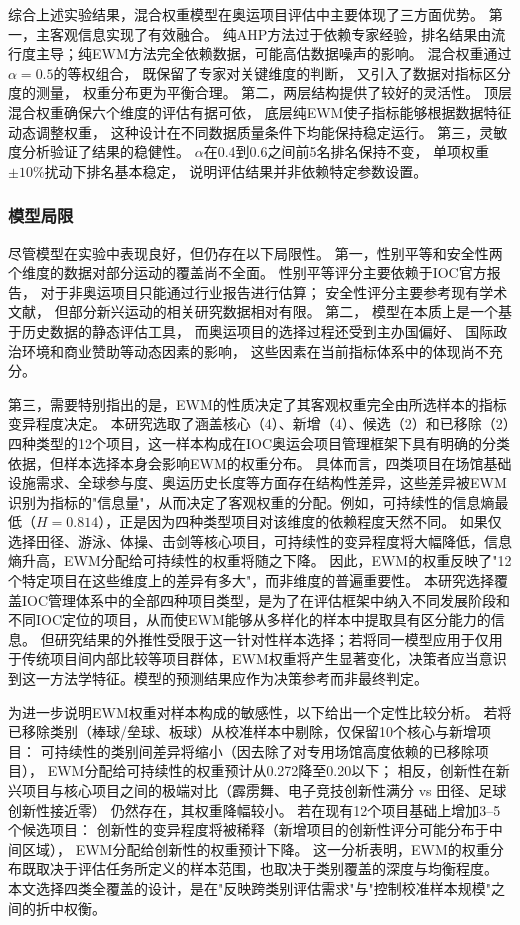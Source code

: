 \documentclass[twoside]{CUGThesis}
\begin{document}
综合上述实验结果，混合权重模型在奥运项目评估中主要体现了三方面优势。
第一，主客观信息实现了有效融合。
纯AHP方法过于依赖专家经验，排名结果由流行度主导；纯EWM方法完全依赖数据，可能高估数据噪声的影响。
混合权重通过$\alpha = 0.5$的等权组合，
既保留了专家对关键维度的判断，
又引入了数据对指标区分度的测量，
权重分布更为平衡合理。
第二，两层结构提供了较好的灵活性。
顶层混合权重确保六个维度的评估有据可依，
底层纯EWM使子指标能够根据数据特征动态调整权重，
这种设计在不同数据质量条件下均能保持稳定运行。
第三，灵敏度分析验证了结果的稳健性。
$\alpha$在0.4到0.6之间前5名排名保持不变，
单项权重$\pm 10\%$扰动下排名基本稳定，
说明评估结果并非依赖特定参数设置。

\subsubsection{模型局限}
\label{sec:ewm_limitation}

尽管模型在实验中表现良好，但仍存在以下局限性。
第一，性别平等和安全性两个维度的数据对部分运动的覆盖尚不全面。
性别平等评分主要依赖于IOC官方报告，
对于非奥运项目只能通过行业报告进行估算；
安全性评分主要参考现有学术文献，
但部分新兴运动的相关研究数据相对有限。
第二，
模型在本质上是一个基于历史数据的静态评估工具，
而奥运项目的选择过程还受到主办国偏好、
国际政治环境和商业赞助等动态因素的影响，
这些因素在当前指标体系中的体现尚不充分。

第三，需要特别指出的是，EWM的性质决定了其客观权重完全由所选样本的指标变异程度决定。
本研究选取了涵盖核心（4）、新增（4）、候选（2）和已移除（2）四种类型的12个项目，这一样本构成在IOC奥运会项目管理框架\cite{IOC2023}下具有明确的分类依据，但样本选择本身会影响EWM的权重分布。
具体而言，四类项目在场馆基础设施需求、全球参与度、奥运历史长度等方面存在结构性差异，这些差异被EWM识别为指标的"信息量"，从而决定了客观权重的分配。例如，可持续性的信息熵最低（$H=0.814$），正是因为四种类型项目对该维度的依赖程度天然不同。
如果仅选择田径、游泳、体操、击剑等核心项目，可持续性的变异程度将大幅降低，信息熵升高，EWM分配给可持续性的权重将随之下降。
因此，EWM的权重反映了"12个特定项目在这些维度上的差异有多大"，而非维度的普遍重要性。
本研究选择覆盖IOC管理体系中的全部四种项目类型，是为了在评估框架中纳入不同发展阶段和不同IOC定位的项目，从而使EWM能够从多样化的样本中提取具有区分能力的信息。
但研究结果的外推性受限于这一针对性样本选择；若将同一模型应用于仅用于传统项目间内部比较等项目群体，EWM权重将产生显著变化，决策者应当意识到这一方法学特征。模型的预测结果应作为决策参考而非最终判定。

为进一步说明EWM权重对样本构成的敏感性，以下给出一个定性比较分析。
若将已移除类别（棒球/垒球、板球）从校准样本中剔除，仅保留10个核心与新增项目：
可持续性的类别间差异将缩小（因去除了对专用场馆高度依赖的已移除项目），
EWM分配给可持续性的权重预计从0.272降至0.20以下；
相反，创新性在新兴项目与核心项目之间的极端对比（霹雳舞、电子竞技创新性满分 vs 田径、足球创新性接近零）
仍然存在，其权重降幅较小。
若在现有12个项目基础上增加3--5个候选项目：
创新性的变异程度将被稀释（新增项目的创新性评分可能分布于中间区域），
EWM分配给创新性的权重预计下降。
这一分析表明，EWM的权重分布既取决于评估任务所定义的样本范围，也取决于类别覆盖的深度与均衡程度。
本文选择四类全覆盖的设计，是在"反映跨类别评估需求"与"控制校准样本规模"之间的折中权衡。
\end{document}
